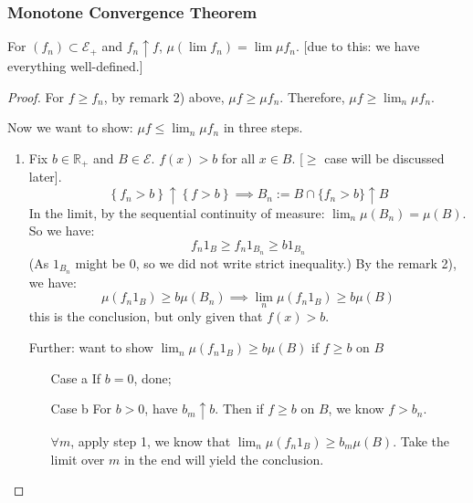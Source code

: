 \documentclass[11pt]{article}
\newcommand{\m}{\mathcal}
\newcommand{\R}{{\mathbb R}}
\begin{document}
        \subsubsection{Monotone Convergence Theorem}
        For $(f_n) \subset \m E_+$ and $f_n \uparrow f$, $\mu (\lim f_n) = \lim \mu
        f_n$. [due to this: we have everything well-defined.]
        \begin{proof}
          For $f \ge f_n$, by remark 2) above, $\mu f \ge \mu f_n$. Therefore, $\mu f \ge
          \lim_n \mu f_n$. 

          Now we want to show: $\mu f \le \lim_n \mu f_n$ in three steps.
          \begin{enumerate}[Step 1]
            \item Fix $b \in \R_+$ and $B \in \m E$. $f(x) > b$ for all $x \in B$.
              [$\ge$ case will be discussed later].
              \[
                \left\{ f_n > b \right\} \uparrow \left\{ f> b \right\} \implies B_n
                := B \cap \{ f_n > b \} \uparrow B
              \]
              In the limit, by the sequential continuity of measure: $\lim_n \mu(B_n)
              = \mu (B)$. So we have: 
              \[
                f_n 1_B \ge f_n 1_{B_n} \ge b 1_{B_n}
              \]
              (As $1_{B_n}$ might be $0$, so we did not write strict inequality.)
              By the remark 2), we have: 
              \[
                \mu(f_n 1_B) \ge b \mu(B_n) \implies 
                \lim _n \mu (f_n 1_B) \ge b \mu(B)
              \]
              this is the conclusion, but only given that $f(x) > b$. 

              \subitem Further: want to show $
              \lim _n \mu (f_n 1_B) \ge b \mu(B)$
              if $f \ge b$ on $B$
              \begin{itemize}
                \item[Case a] If $b = 0$, done;
                \item[Case b] For $b > 0$, have $b_m \uparrow b$. Then
                  if $f \ge b$ on $B$, we know $f > b_n$. 

                  $\forall m$,  apply step 1, we know that $\lim _n \mu(f_n1_B) \ge
                  b_m \mu(B)$. Take the limit over $m$ in the end will yield the
                  conclusion.
              \end{itemize}


\end{enumerate}
\end{proof}
\end{document}
